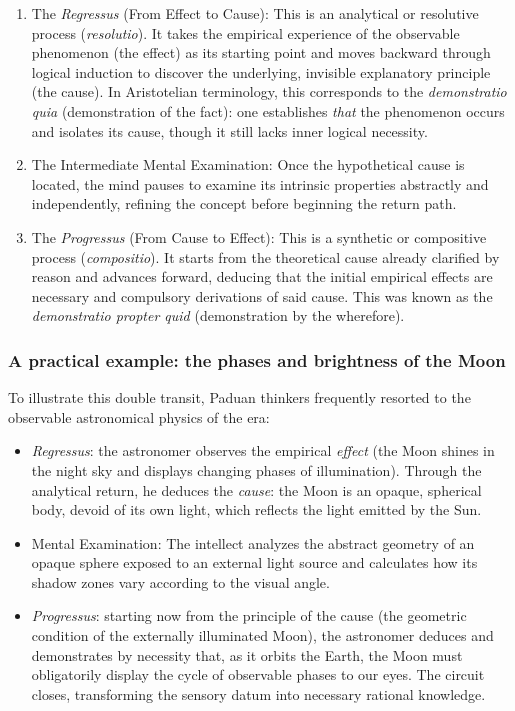 \documentclass[11pt, a4paper]{article}
\begin{document}
\begin{enumerate}
	\item \textrm{The \textit{Regressus} (From Effect to Cause):} This is an analytical or resolutive process (\textit{resolutio}). It takes the empirical experience of the observable phenomenon (the effect) as its starting point and moves backward through logical induction to discover the underlying, invisible explanatory principle (the cause). In Aristotelian terminology, this corresponds to the \textit{demonstratio quia} (demonstration of the fact): one establishes \textit{that} the phenomenon occurs and isolates its cause, though it still lacks inner logical necessity.
	\item \textrm{The Intermediate Mental Examination:} Once the hypothetical cause is located, the mind pauses to examine its intrinsic properties abstractly and independently, refining the concept before beginning the return path.
	\item \textrm{The \textit{Progressus} (From Cause to Effect):} This is a synthetic or compositive process (\textit{compositio}). It starts from the theoretical cause already clarified by reason and advances forward, deducing that the initial empirical effects are necessary and compulsory derivations of said cause. This was known as the \textit{demonstratio propter quid} (demonstration by the wherefore).
\end{enumerate}



\subsubsection*{A practical example: the phases and brightness of the Moon}
To illustrate this double transit, Paduan thinkers frequently resorted to the observable astronomical physics of the era:

\begin{itemize}
	\item \textrm{\textit{Regressus}:} the astronomer observes the empirical \textit{effect} (the Moon shines in the night sky and displays changing phases of illumination). Through the analytical return, he deduces the \textit{cause}: the Moon is an opaque, spherical body, devoid of its own light, which reflects the light emitted by the Sun.
	\item \textrm{Mental Examination:} The intellect analyzes the abstract geometry of an opaque sphere exposed to an external light source and calculates how its shadow zones vary according to the visual angle.
	\item \textrm{\textit{Progressus}:} starting now from the principle of the cause (the geometric condition of the externally illuminated Moon), the astronomer deduces and demonstrates by necessity that, as it orbits the Earth, the Moon must obligatorily display the cycle of observable phases to our eyes. The circuit closes, transforming the sensory datum into necessary rational knowledge.
\end{itemize}
\end{document}
